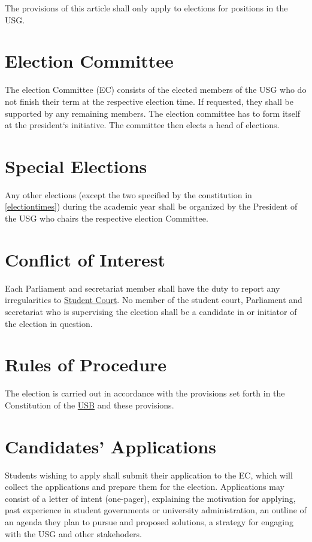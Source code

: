 \label{electionprocedurebylaws}

The provisions of this article shall only apply to elections for positions in the USG.

\section{Election Committee} 
The election Committee (EC) consists of the elected members of the USG who do not finish their term at the respective election time. If requested, they shall be supported by any remaining members. The election committee has to form itself at the president`s initiative. The committee then elects a head of elections. 

\section{Special Elections} 
Any other elections (except the two specified by the constitution in \ref{electiontimes}) during the academic year shall be organized by the President of the USG who chairs the respective election Committee.

\section{Conflict of Interest}
Each Parliament and secretariat member shall have the duty to report any irregularities to \hyperref[StudentCourtDef]{Student Court}. No member of the student court, Parliament and secretariat who is supervising the election shall be a candidate in or initiator of the election in question.

\section{Rules of Procedure} 
The election is carried out in accordance with the provisions set forth in the Constitution of the \hyperref[studentbody]{USB} and these provisions.

\section{Candidates' Applications}
Students wishing to apply shall submit their application to the EC, which will collect the applications and prepare them for the election. Applications may consist of a letter of intent (one-pager), explaining the motivation for applying, past experience in student governments or university administration, an outline of an agenda they plan to pursue and proposed solutions, a strategy for engaging with the USG and other stakehoders.


